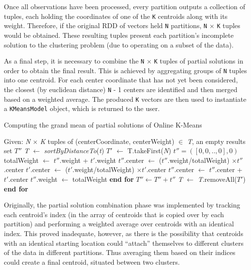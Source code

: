 \documentclass{l4proj}
\begin{document}
Once all observations have been processed, every partition outputs a collection of tuples, each holding the coordinates of one of the \texttt{K} centroids along with its weight. Therefore, if the original RDD of vectors held \texttt{N} partitions, \texttt{N} $\times$ \texttt{K} tuples would be obtained. These resulting tuples present each partition's incomplete solution to the clustering problem (due to operating on a subset of the data).

As a final step, it is necessary to combine the \texttt{N} $\times$ \texttt{K} tuples of partial solutions in order to obtain the final result. This is achieved by aggregating groups of \texttt{N} tuples into one centroid. For each center coordinate that has not yet been considered, the closest (by euclidean distance) \texttt{N} - 1 centers are identified and then merged based on a weighted average. The produced \texttt{K} vectors are then used to instantiate a \texttt{KMeansModel} object, which is returned to the user.

\begin{algorithm}[H]
\caption{Computing the grand mean of partial solutions of Online K-Means}\label{online-merge}
\begin{algorithmic}[1]
\State Given: \textit{N} $\times$ \textit{K} tuples of (centerCoordinate, centerWeight) $\in$ \textit{T}, an empty results set $T''$ 
    \State \textit{T}  $\gets$ \textit{sortByDistanceTo}(\textit{t})
    \State $T'$ $\gets$ T.takeFirst(\textit{N})
    \State $t'' = ([0 ,0, .., 0], 0)$
    	\State totalWeight $\gets$ $t''$.weight + $t'$.weight
        \State $t''$.center $\gets$ ($t''$.weight/totalWeight) $\times t''$.center
        \State $t'$.center $\gets$ ($t'$.weight/totalWeight) $\times t'$.center
        \State $t''$.center $\gets$ $t''$.center + $t'$.center
        \State $t''$.weight $\gets$ totalWeight
    \EndFor
    \State \textbf{end for}
    \State $T'' \gets T'' + t''$
    \State \textit{T} $\gets$ \textit{T}.removeAll($T'$)
\EndFor
\State \textbf{end for}
\end{algorithmic}
\end{algorithm}

Originally, the partial solution combination phase was implemented by tracking each centroid's index (in the array of centroids that is copied over by each partition) and performing a weighted average over centroids with an identical index. This proved inadequate, however, as there is the possibility that centroids with an identical starting location could ``attach'' themselves to different clusters of the data in different partitions. Thus averaging them based on their indices could create a final centroid, situated between two clusters.
\end{document}
